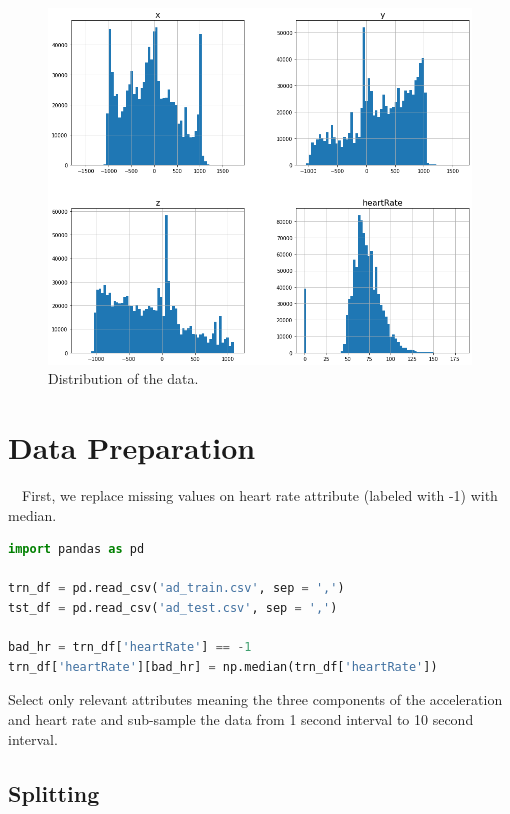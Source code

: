\begin{figure}[H]
\centering
  \includegraphics[scale=0.4]{img/task_2/histograms.png}
  \caption{Distribution of the data.}
  \label{fig: histograms task 2 }
\end{figure}





\section*{Data Preparation}\label{Data Preparation}

~~First, we replace missing values on heart rate attribute (labeled with -1) with median.

\begin{lstlisting}[language=Python]
import pandas as pd

trn_df = pd.read_csv('ad_train.csv', sep = ',')
tst_df = pd.read_csv('ad_test.csv', sep = ',')

bad_hr = trn_df['heartRate'] == -1
trn_df['heartRate'][bad_hr] = np.median(trn_df['heartRate'])
\end{lstlisting}

Select only relevant attributes meaning the three components of the acceleration and heart rate and sub-sample the data from 1 second interval to 10 second interval.

\subsection*{Splitting}\label{Splitting}

